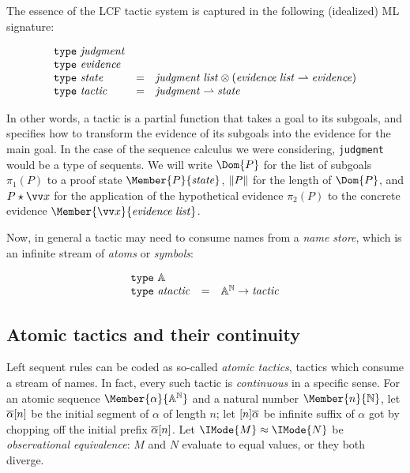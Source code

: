 The essence of the LCF tactic system is captured in the following (idealized)
ML signature:

\[
  \begin{array}{lcl}
    \mathtt{type}\ \mathit{judgment}\\
    \mathtt{type}\ \mathit{evidence}\\
    \mathtt{type}\ \mathit{state} &= &\mathit{judgment}\;\mathit{list} \otimes (\mathit{evidence}\;\mathit{list}\rightharpoonup \mathit{evidence})\\
    \mathtt{type}\ \mathit{tactic} &= &\mathit{judgment}\rightharpoonup \mathit{state}
  \end{array}
\]

In other words, a tactic is a partial function that takes a goal to its
subgoals, and specifies how to transform the evidence of its subgoals into the
evidence for the main goal. In the case of the sequence calculus we were
considering, \verb!judgment! would be a type of sequents. We will write
$\Dom{P}$ for the list of subgoals $\pi_1(P)$ to a proof state
$\Member{P}{\LCFState}$, $\lVert P\rVert$ for the length of $\Dom{P}$, and
$\LCFStateApply{P}{\vec{x}}$ for the application of the hypothetical evidence
$\pi_2(P)$ to the concrete evidence $\Member{\vec{x}}{\MLList{\LCFEvidence}}$.

Now, in general a tactic may need to consume names from a \emph{name store},
which is an infinite stream of \emph{atoms} or \emph{symbols}:

\[
  \begin{array}{lcl}
    \mathtt{type}\ \mathbb{A}\\
    \mathtt{type}\ \mathit{atactic} &= &{\mathbb{A}}^{\mathbb{N}} \to \mathit{tactic}
  \end{array}
\]

\newcommand\KleeneEq[2]{\IMode{#1}\approx \IMode{#2}}
\newcommand\ModC[1]{\mathsf{M}(#1)}

\subsection{Atomic tactics and their continuity}

Left sequent rules can be coded as so-called \emph{atomic tactics}, tactics
which consume a stream of names. In fact, every such tactic is
\emph{continuous} in a specific sense. For an atomic sequence
$\Member{\alpha}{\MLStream{\MLAtom}}$ and a natural number
$\Member{n}{\MLNat}$, let $\protect\overline{\alpha}[n]$ be the initial segment of
$\alpha$ of length $n$; let $[n]\protect\overline{\alpha}$ be infinite suffix of
$\alpha$ got by chopping off the initial prefix $\protect\overline{\alpha}[n]$. Let
$\KleeneEq{M}{N}$ be \emph{observational equivalence}: $M$ and $N$ evaluate to
equal values, or they both diverge.

